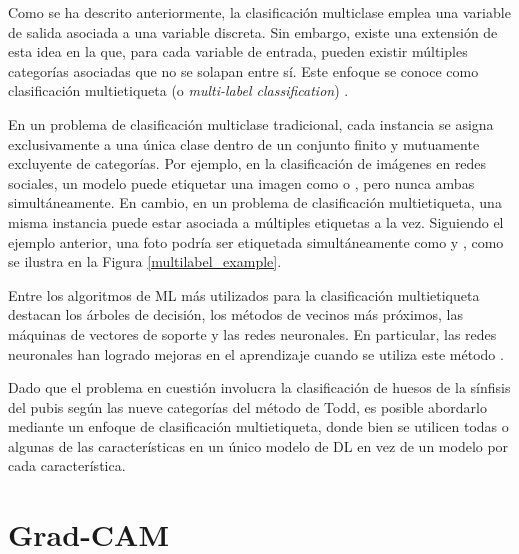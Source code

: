 Como se ha descrito anteriormente, la clasificación multiclase emplea una variable de salida asociada a una variable discreta. Sin embargo, existe una extensión de esta idea en la que, para cada variable de entrada, pueden existir múltiples categorías asociadas que no se solapan entre sí. Este enfoque se conoce como clasificación multietiqueta (o \textit{multi-label classification}) \cite{tarekegn_deep_2024}.

En un problema de clasificación multiclase tradicional, cada instancia se asigna exclusivamente a una única clase dentro de un conjunto finito y mutuamente excluyente de categorías. Por ejemplo, en la clasificación de imágenes en redes sociales, un modelo puede etiquetar una imagen como  o , pero nunca ambas simultáneamente. En cambio, en un problema de clasificación multietiqueta, una misma instancia puede estar asociada a múltiples etiquetas a la vez. Siguiendo el ejemplo anterior, una foto podría ser etiquetada simultáneamente como  y , como se ilustra en la Figura \ref{multilabel_example}.

Entre los algoritmos de ML más utilizados para la clasificación multietiqueta destacan los árboles de decisión, los métodos de vecinos más próximos, las máquinas de vectores de soporte y las redes neuronales. En particular, las redes neuronales han logrado mejoras en el aprendizaje cuando se utiliza este método \cite{ranjan_hyperface_2019}.

Dado que el problema en cuestión involucra la clasificación de huesos de la sínfisis del pubis según las nueve categorías del método de Todd, es posible abordarlo mediante un enfoque de clasificación multietiqueta, donde bien se utilicen todas o algunas de las características en un único modelo de DL en vez de un modelo por cada característica.

\section{Grad-CAM}
\label{section2:gradcam}

